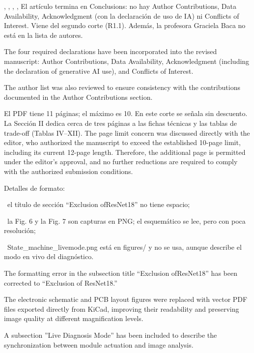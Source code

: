 \documentclass{LabDSTresponse}
\begin{document}
	\LabDSTsummary
	
	
	
	{,
		,
		,
		,
		}
	{El artículo termina en Conclusions: no hay
		Author Contributions, Data Availability,
		Acknowledgment (con la declaración de uso de IA)
		ni Conflicts of Interest. Viene del segundo
		corte (R1.1). Además, la profesora Graciela Baca
		no está en la lista de autores.}
	{
		The four required declarations have been
		incorporated into the revised manuscript:
		Author Contributions, Data Availability,
		Acknowledgment (including the declaration
		of generative AI use), and Conflicts of
		Interest.
		
		The author list was also reviewed to ensure
		consistency with the contributions documented
		in the Author Contributions section.
	}
	
	{El PDF tiene 11 páginas; el máximo es 10.
		En este corte se señala sin descuento.
		La Sección II dedica cerca de tres páginas
		a las fichas técnicas y las tablas de
		trade-off (Tablas IV--XII).}
	{The page limit concern was discussed directly
		with the editor, who authorized the manuscript
		to exceed the established 10-page limit, including its current 12-page length.
	Therefore, the additional page is permitted
		under the editor's approval, and no further
		reductions are required to comply with the
		authorized submission conditions.}
	
	{Detalles de formato:
		
		\par\noindent\textbullet\ el título de sección
		``Exclusion ofResNet18'' no tiene espacio;
		
		\par\noindent\textbullet\ la Fig. 6 y la Fig. 7
		son capturas en PNG; el esquemático se lee,
		pero con poca resolución;
		
		\par\noindent\textbullet\
		State\_machine\_livemode.png está en figures/
		y no se usa, aunque describe el modo en vivo
		del diagnóstico.}
	{The formatting error in the subsection title
		``Exclusion ofResNet18'' has been corrected to
		``Exclusion of ResNet18.''
		
		The electronic schematic and PCB layout figures
		were replaced with vector PDF files exported
		directly from KiCad, improving their readability
		and preserving image quality at different
		magnification levels.
		
		A subsection ''Live Diagnosis Mode'' has been included to describe the synchronization between module
		actuation and image analysis.}
	
\end{document}
